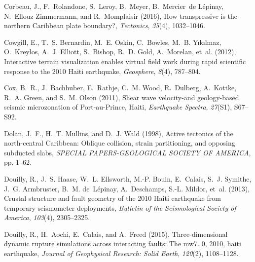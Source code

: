 \documentclass[linenumbers,draft]{agujournal}
\begin{document}
\begin{thebibliography}{65}
Corbeau, J., F.~Rolandone, S.~Leroy, B.~Meyer, B.~Mercier~de L{\'e}pinay,
  N.~Ellouz-Zimmermann, and R.~Momplaisir (2016), How transpressive is the
  northern {Caribbean plate boundary?}, \textit{Tectonics}, \textit{35}(4),
  1032--1046.

Cowgill, E., T.~S. Bernardin, M.~E. Oskin, C.~Bowles, M.~B. Y{\i}k{\i}lmaz,
  O.~Kreylos, A.~J. Elliott, S.~Bishop, R.~D. Gold, A.~Morelan, et~al. (2012),
  Interactive terrain visualization enables virtual field work during rapid
  scientific response to the 2010 {Haiti} earthquake, \textit{Geosphere},
  \textit{8}(4), 787--804.

Cox, B.~R., J.~Bachhuber, E.~Rathje, C.~M. Wood, R.~Dulberg, A.~Kottke, R.~A.
  Green, and S.~M. Olson (2011), {Shear wave velocity-and geology-based seismic
  microzonation of Port-au-Prince, Haiti}, \textit{Earthquake Spectra},
  \textit{27}(S1), S67--S92.

Dolan, J.~F., H.~T. Mullins, and D.~J. Wald (1998), Active tectonics of the
  north-central {Caribbean: Oblique} collision, strain partitioning, and
  opposing subducted slabs, \textit{SPECIAL PAPERS-GEOLOGICAL SOCIETY OF
  AMERICA}, pp. 1--62.

Douilly, R., J.~S. Haase, W.~L. Ellsworth, M.-P. Bouin, E.~Calais, S.~J.
  Symithe, J.~G. Armbruster, B.~M. de~L{\'e}pinay, A.~Deschamps, S.-L. Mildor,
  et~al. (2013), Crustal structure and fault geometry of the 2010 {Haiti}
  earthquake from temporary seismometer deployments, \textit{Bulletin of the
  Seismological Society of America}, \textit{103}(4), 2305--2325.

Douilly, R., H.~Aochi, E.~Calais, and A.~Freed (2015), Three-dimensional
  dynamic rupture simulations across interacting faults: The mw7. 0, 2010,
  haiti earthquake, \textit{Journal of Geophysical Research: Solid Earth},
  \textit{120}(2), 1108--1128.


\end{thebibliography}
\end{document}
